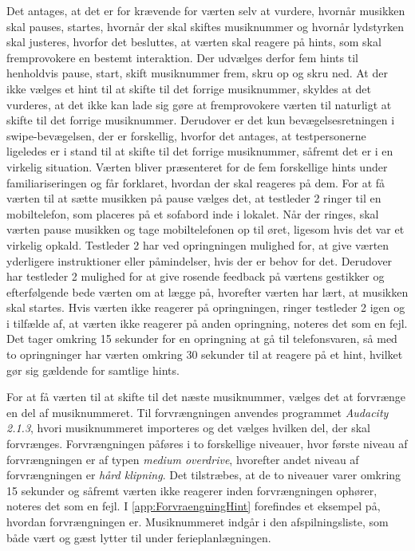 Det antages, at det er for krævende for værten selv at vurdere, hvornår musikken skal pauses, startes, hvornår der skal skiftes musiknummer og hvornår lydstyrken skal justeres, hvorfor det besluttes, at værten skal reagere på hints, som skal fremprovokere en bestemt interaktion. Der udvælges derfor fem hints til henholdvis pause, start, skift musiknummer frem, skru op og skru ned. At der ikke vælges et hint til at skifte til det forrige musiknummer, skyldes at det vurderes, at det ikke kan lade sig gøre at fremprovokere værten til naturligt at skifte til det forrige musiknummer. Derudover er det kun bevægelsesretningen i swipe-bevægelsen, der er forskellig, hvorfor det antages, at testpersonerne ligeledes er i stand til at skifte til det forrige musiknummer, såfremt det er i en virkelig situation. Værten bliver præsenteret for de fem forskellige hints under familiariseringen og får forklaret, hvordan der skal reageres på dem. For at få værten til at sætte musikken på pause vælges det, at testleder 2 ringer til en mobiltelefon, som placeres på et sofabord inde i lokalet. Når der ringes, skal værten pause musikken og tage mobiltelefonen op til øret, ligesom hvis det var et virkelig opkald. Testleder 2 har ved opringningen mulighed for, at give værten yderligere instruktioner eller påmindelser, hvis der er behov for det. Derudover har testleder 2 mulighed for at give rosende feedback på værtens gestikker og efterfølgende bede værten om at lægge på, hvorefter værten har lært, at musikken skal startes. Hvis værten ikke reagerer på opringningen, ringer testleder 2 igen og i tilfælde af, at værten ikke reagerer på anden opringning, noteres det som en fejl. Det tager omkring 15 sekunder for en opringning at gå til telefonsvaren, så med to opringninger har værten omkring 30 sekunder til at reagere på et hint, hvilket gør sig gældende for samtlige hints. 

For at få værten til at skifte til det næste musiknummer, vælges det at forvrænge en del af musiknummeret. Til forvrængningen anvendes programmet \textit{Audacity 2.1.3}, hvori musiknummeret importeres og det vælges hvilken del, der skal forvrænges. Forvrængningen påføres i to forskellige niveauer, hvor første niveau af forvrængningen er af typen \textit{medium overdrive}, hvorefter andet niveau af forvrængningen er \textit{hård klipning}. Det tilstræbes, at de to niveauer varer omkring 15 sekunder og såfremt værten ikke reagerer inden forvrængningen ophører, noteres det som en fejl. I \autoref{app:ForvraengningHint} forefindes et eksempel på, hvordan forvrængningen er. Musiknummeret indgår i den afspilningsliste, som både vært og gæst lytter til under ferieplanlægningen. 

